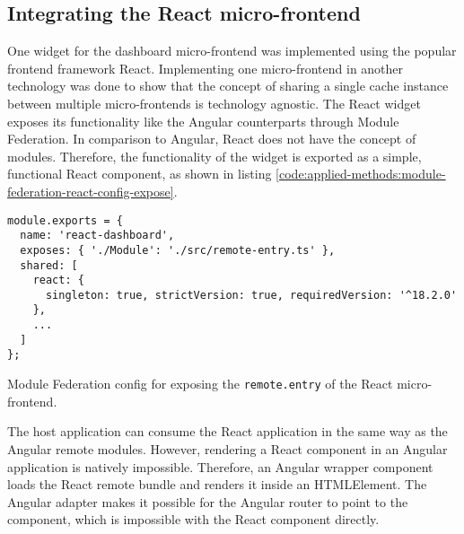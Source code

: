 \subsection{Integrating the React micro-frontend}\label{subsection:applied-methods:prototypical-implementation:react-micro-frontend}

One widget for the dashboard micro-frontend was implemented using the popular frontend framework React. Implementing one micro-frontend in another technology was done to show that the concept of sharing a single cache instance between multiple micro-frontends is technology agnostic. The React widget exposes its functionality like the Angular counterparts through Module Federation. In comparison to Angular, React does not have the concept of modules. Therefore, the functionality of the widget is exported as a simple, functional React component, as shown in listing  \ref{code:applied-methods:module-federation-react-config-expose}.

\ifshowListings
\begin{listing}[H]
    \begin{verbatim}
module.exports = {
  name: 'react-dashboard',
  exposes: { './Module': './src/remote-entry.ts' },
  shared: [
    react: {
      singleton: true, strictVersion: true, requiredVersion: '^18.2.0' 
    },
    ...
  ]
};
    \end{verbatim}
    \caption{Module Federation config for exposing the \texttt{remote.entry} of the React micro-frontend.}\label{code:applied-methods:module-federation-react-config-expose}
\end{listing}
\fi

\noindent The host application can consume the React application in the same way as the Angular remote modules. However, rendering a React component in an Angular application is natively impossible. Therefore, an Angular wrapper component loads the React remote bundle and renders it inside an HTMLElement. The Angular adapter makes it possible for the Angular router to point to the component, which is impossible with the React component directly.

\bigskip

